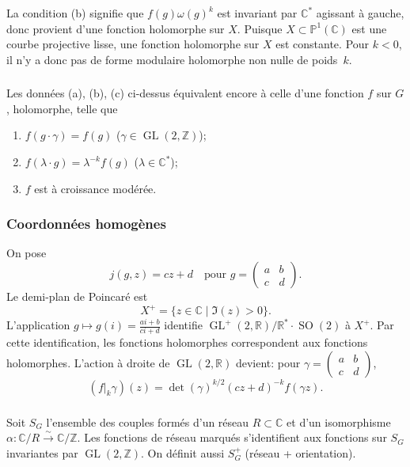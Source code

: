 \documentclass[11pt,a4paper]{amsart}
\theoremstyle{plain}
\theoremstyle{definition}
\theoremstyle{remark}
\DeclareMathOperator{\GL}{GL}
\DeclareMathOperator{\SO}{SO}
\newcommand{\ZZ}{\mathbb{Z}}
\newcommand{\RR}{\mathbb{R}}
\newcommand{\CC}{\mathbb{C}}
\begin{document}
La condition (b) signifie que $f(g)\omega(g)^k$ est invariant par $\CC^*$ agissant \`a gauche, donc provient d'une fonction holomorphe sur $X$. Puisque $X \subset \mathbb{P}^1(\CC)$ est une courbe projective lisse, une fonction holomorphe sur $X$ est constante. Pour $k < 0$, il n'y a donc pas de forme modulaire holomorphe non nulle de poids~$k$.

\subsubsection{}
\label{sec:1.1.5}

Les donn\'ees (a), (b), (c) ci-dessus \'equivalent encore \`a celle d'une fonction $f$ sur $G$, holomorphe, telle que
\begin{enumerate}
\item[(i)] $f(g \cdot \gamma) = f(g)$ ($\gamma \in \GL(2,\ZZ)$);
\item[(ii)] $f(\lambda \cdot g) = \lambda^{-k} f(g)$ ($\lambda \in \CC^*$);
\item[(iii)] $f$ est \`a croissance mod\'er\'ee.
\end{enumerate}

\subsubsection{Coordonn\'ees homog\`enes} \label{sec:1.1.5.1}

On pose
\[ j(g,z) = cz + d \quad \text{pour } g = \begin{pmatrix} a & b \\ c & d \end{pmatrix}. \]
Le demi-plan de Poincar\'e est
\[ X^+ = \{ z \in \CC \mid \Im(z) > 0 \}. \]
L'application $g \mapsto g(i) = \frac{ai+b}{ci+d}$ identifie $\GL^+(2,\RR)/\RR^* \cdot \SO(2)$ \`a $X^+$. Par cette identification, les fonctions holomorphes correspondent aux fonctions holomorphes. L'action \`a droite de $\GL(2,\RR)$ devient: pour $\gamma = \begin{pmatrix} a & b \\ c & d \end{pmatrix}$,
\[ (f|_k \gamma)(z) = \det(\gamma)^{k/2} (cz+d)^{-k} f(\gamma z). \]

\subsubsection{}
\label{sec:1.1.6}

Soit $S_G$ l'ensemble des couples form\'es d'un r\'eseau $R \subset \CC$ et d'un isomorphisme $\alpha: \CC/R \xrightarrow{\sim} \CC/\ZZ$. Les fonctions de r\'eseau marqu\'es s'identifient aux fonctions sur $S_G$ invariantes par $\GL(2,\ZZ)$. On d\'efinit aussi $S_G^+$ (r\'eseau + orientation).
\end{document}
